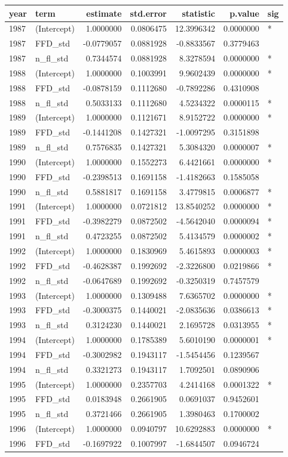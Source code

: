\documentclass[]{article}
\begin{document}
\begin{longtable}[]{@{}llrrrrl@{}}
\toprule
year & term & estimate & std.error & statistic & p.value &
sig\tabularnewline
\midrule
\endhead
1987 & (Intercept) & 1.0000000 & 0.0806475 & 12.3996342 & 0.0000000 &
*\tabularnewline
1987 & FFD\_std & -0.0779057 & 0.0881928 & -0.8833567 & 0.3779463
&\tabularnewline
1987 & n\_fl\_std & 0.7344574 & 0.0881928 & 8.3278594 & 0.0000000 &
*\tabularnewline
1988 & (Intercept) & 1.0000000 & 0.1003991 & 9.9602439 & 0.0000000 &
*\tabularnewline
1988 & FFD\_std & -0.0878159 & 0.1112680 & -0.7892286 & 0.4310908
&\tabularnewline
1988 & n\_fl\_std & 0.5033133 & 0.1112680 & 4.5234322 & 0.0000115 &
*\tabularnewline
1989 & (Intercept) & 1.0000000 & 0.1121671 & 8.9152722 & 0.0000000 &
*\tabularnewline
1989 & FFD\_std & -0.1441208 & 0.1427321 & -1.0097295 & 0.3151898
&\tabularnewline
1989 & n\_fl\_std & 0.7576835 & 0.1427321 & 5.3084320 & 0.0000007 &
*\tabularnewline
1990 & (Intercept) & 1.0000000 & 0.1552273 & 6.4421661 & 0.0000000 &
*\tabularnewline
1990 & FFD\_std & -0.2398513 & 0.1691158 & -1.4182663 & 0.1585058
&\tabularnewline
1990 & n\_fl\_std & 0.5881817 & 0.1691158 & 3.4779815 & 0.0006877 &
*\tabularnewline
1991 & (Intercept) & 1.0000000 & 0.0721812 & 13.8540252 & 0.0000000 &
*\tabularnewline
1991 & FFD\_std & -0.3982279 & 0.0872502 & -4.5642040 & 0.0000094 &
*\tabularnewline
1991 & n\_fl\_std & 0.4723255 & 0.0872502 & 5.4134579 & 0.0000002 &
*\tabularnewline
1992 & (Intercept) & 1.0000000 & 0.1830969 & 5.4615893 & 0.0000003 &
*\tabularnewline
1992 & FFD\_std & -0.4628387 & 0.1992692 & -2.3226800 & 0.0219866 &
*\tabularnewline
1992 & n\_fl\_std & -0.0647689 & 0.1992692 & -0.3250319 & 0.7457579
&\tabularnewline
1993 & (Intercept) & 1.0000000 & 0.1309488 & 7.6365702 & 0.0000000 &
*\tabularnewline
1993 & FFD\_std & -0.3000375 & 0.1440021 & -2.0835636 & 0.0386613 &
*\tabularnewline
1993 & n\_fl\_std & 0.3124230 & 0.1440021 & 2.1695728 & 0.0313955 &
*\tabularnewline
1994 & (Intercept) & 1.0000000 & 0.1785389 & 5.6010190 & 0.0000001 &
*\tabularnewline
1994 & FFD\_std & -0.3002982 & 0.1943117 & -1.5454456 & 0.1239567
&\tabularnewline
1994 & n\_fl\_std & 0.3321273 & 0.1943117 & 1.7092501 & 0.0890906
&\tabularnewline
1995 & (Intercept) & 1.0000000 & 0.2357703 & 4.2414168 & 0.0001322 &
*\tabularnewline
1995 & FFD\_std & 0.0183948 & 0.2661905 & 0.0691037 & 0.9452601
&\tabularnewline
1995 & n\_fl\_std & 0.3721466 & 0.2661905 & 1.3980463 & 0.1700002
&\tabularnewline
1996 & (Intercept) & 1.0000000 & 0.0940797 & 10.6292883 & 0.0000000 &
*\tabularnewline
1996 & FFD\_std & -0.1697922 & 0.1007997 & -1.6844507 & 0.0946724

\end{longtable}
\end{document}
